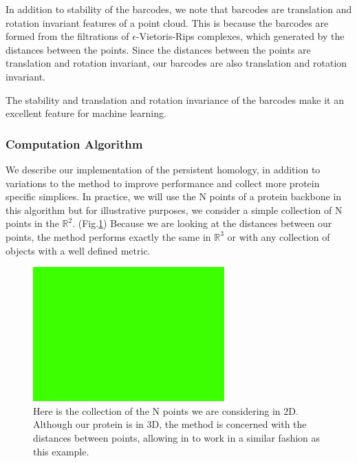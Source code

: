 \documentclass[12pt, a4paper, twocolumn, fullpage]{article}
\theoremstyle{plain}
\theoremstyle{definition}
\theoremstyle{remark}
\begin{document}
In addition to stability of the barcodes, we note that barcodes are translation and rotation invariant features of a point cloud. This is because the barcodes are formed from the filtrations of $\epsilon$-Vietoris-Rips complexes, which generated by the distances between the points. Since the distances between the points are translation and rotation invariant, our barcodes are also translation and rotation invariant.

The stability and translation and rotation invariance of the barcodes make it an excellent feature for machine learning.

\subsubsection{Computation Algorithm}
We describe our implementation of the persistent homology, in addition to variations to the method to improve performance and collect more protein specific simplices. 
In practice, we will use the N points of a protein backbone in this algorithm but for illustrative purposes, we consider a simple collection of N points in the $\mathbb{R}^2$. (Fig.\ref{Collection of points}) Because we are looking at the distances between our points, the method performs exactly the same in $\mathbb{R}^3$ or with any collection of objects with a well defined metric.

\begin{figure}[t]
    \includegraphics[width=\linewidth]{img/blank.png}
    \caption{Here is the collection of the N points we are considering in 2D. Although our protein is in 3D, the method is concerned with the distances between points, allowing in to work in a similar fashion as this example.}
    \label{Collection of points}
\end{figure}
\end{document}

